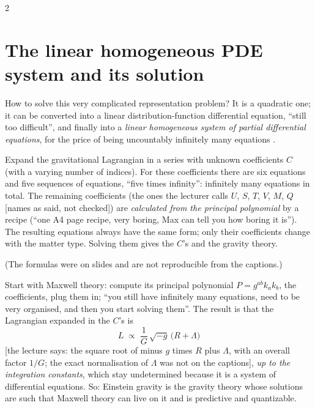 \begin{paracol}{2}
\section{The linear homogeneous PDE system and its solution}\label{sec:c26-solving}

How to solve this very complicated representation problem? It is a quadratic one; it can be converted into a linear distribution-function differential equation, ``still too difficult'', and finally into a \emph{linear homogeneous system of partial differential equations}, for the price of being uncountably infinitely many equations .

\begin{theorem}\label{thm:c26-pde}
Expand the gravitational Lagrangian in a series with unknown coefficients $C$ (with a varying number of indices). For these coefficients there are six equations and five sequences of equations, ``five times infinity'': infinitely many equations in total. The remaining coefficients (the ones the lecturer calls $U$, $S$, $T$, $V$, $M$, $Q$ [names as said, not checked]) are \emph{calculated from the principal polynomial} by a recipe (``one A4 page recipe, very boring, Max can tell you how boring it is''). The resulting equations always have the same form; only their coefficients change with the matter type. Solving them gives the $C$'s and the gravity theory.
\end{theorem}
(The formulas were on slides and are not reproducible from the captions.)

\begin{example}\label{ex:c26-einstein}
Start with Maxwell theory: compute its principal polynomial $P=g^{ab}k_ak_b$, the coefficients, plug them in; ``you still have infinitely many equations, need to be very organised, and then you start solving them''. The result is that the Lagrangian expanded in the $C$'s is
\[
  L\;\propto\;\frac1G\,\sqrt{-g}\,\bigl(R+\Lambda\bigr)
\]
[the lecture says: the square root of minus $g$ times $R$ plus $\Lambda$, with an overall factor $1/G$; the exact normalisation of $\Lambda$ was not on the captions], \emph{up to the integration constants}, which stay undetermined because it is a system of differential equations. So: Einstein gravity is the gravity theory whose solutions are such that Maxwell theory can live on it and is predictive and quantizable.
\end{example}


\end{paracol}
